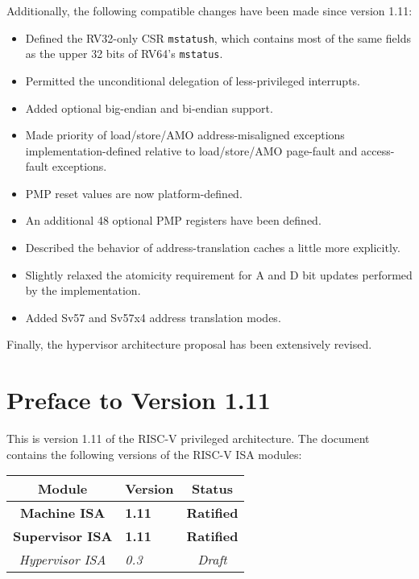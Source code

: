 Additionally, the following compatible changes have been made since version
1.11:
\vspace{-0.2in}
\begin{itemize}
  \parskip 0pt
  \itemsep 1pt
\item Defined the RV32-only CSR {\tt mstatush}, which contains most of the
  same fields as the upper 32 bits of RV64's {\tt mstatus}.
\item Permitted the unconditional delegation of less-privileged interrupts.
\item Added optional big-endian and bi-endian support.
\item Made priority of load/store/AMO address-misaligned exceptions
  implementation-defined relative to load/store/AMO page-fault
  and access-fault exceptions.
\item PMP reset values are now platform-defined.
\item An additional 48 optional PMP registers have been defined.
\item Described the behavior of address-translation caches a little more
  explicitly.
\item Slightly relaxed the atomicity requirement for A and D bit updates
  performed by the implementation.
\item Added Sv57 and Sv57x4 address translation modes.
\end{itemize}

Finally, the hypervisor architecture proposal has been extensively revised.

\newpage

\section*{Preface to Version 1.11}

This is version 1.11 of the RISC-V privileged architecture.
The document contains the following versions of the RISC-V ISA
modules:

{
\begin{table}[hbt]
  \centering
  \begin{tabular}{|c|l|c|}
    \hline
    Module             & Version  & Status\\
    \hline
    \bf Machine ISA    & \bf 1.11 & \bf Ratified \\
    \bf Supervisor ISA & \bf 1.11 & \bf Ratified \\
    \em Hypervisor ISA & \em 0.3  & \em Draft \\
    \hline
  \end{tabular}
\end{table}
}

